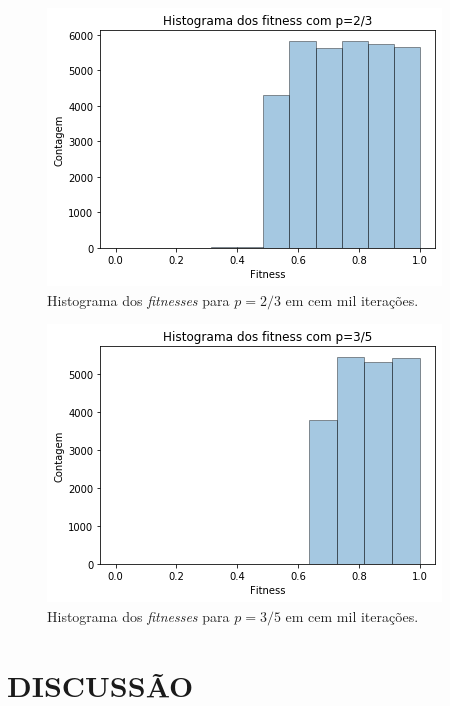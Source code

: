 \documentclass[10pt,brazil,english]{article}
\begin{document}
            \begin{figure}[!hbtp]
                \begin{center}
                    \includegraphics[scale=0.5]{Images/5-2-1.png}
                \end{center}
                \caption{Histograma dos \textit{fitnesses} para $p = 2/3$ em cem mil iterações.}
                \label{Fig2}
            \end{figure}

            \begin{figure}[!hbtp]
                \begin{center}
                    \includegraphics[scale=0.5]{Images/5-2-2.png}
                \end{center}
                \caption{Histograma dos \textit{fitnesses} para $p = 3/5$ em cem mil iterações.}
                \label{Fig3}
            \end{figure}            

    \section{\uppercase{Discussão}}
\end{document}

